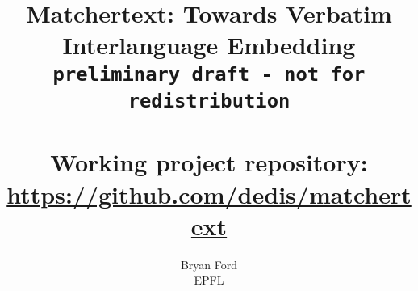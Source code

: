 \documentclass[fullpage,twocolumn]{article}
\begin{document}
\title{Matchertext: Towards Verbatim Interlanguage Embedding \\
	\texttt{preliminary draft - not for redistribution} \\
	~\\
	\Large{Working project repository: \url{https://github.com/dedis/matchertext}}}

\author{Bryan Ford \\ EPFL}

\maketitle

\tableofcontents













\arxiv{

}{

}
\end{document}
